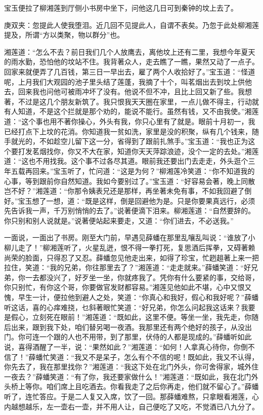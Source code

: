 \begin{parag}
    宝玉便拉了柳湘莲到厅侧小书房中坐下，问他这几日可到秦钟的坟上去了。\begin{note}庚双夹：忽提此人使我堕泪。近几回不见提此人，自谓不表矣。乃忽于此处柳湘莲提及，所谓“方以类聚，物以群分”也。\end{note}湘莲道：“怎么不去？前日我们几个人放鹰去，离他坟上还有二里，我想今年夏天的雨水勤，恐怕他的坟站不住。我背著众人，走去瞧了一瞧，果然又动了一点子。回家来就便弄了几百钱，第三日一早出去，雇了两个人收拾好了。”宝玉道：“怪道呢，上月我们大观园的池子里头结了莲蓬，我摘了十个，叫茗烟出去到坟上供他去，回来我也问他可被雨冲坏了没有。他说不但不冲，且比上回又新了些。我想著，不过是这几个朋友新筑了。我只恨我天天圈在家里，一点儿做不得主，行动就有人知道，不是这个拦就是那个劝的，能说不能行。虽然有钱，又不由我使。”湘莲道：“这个事也用不著你操心，外头有我，你只心里有了就是。眼前十月初一，我已经打点下上坟的花消。你知道我一贫如洗，家里是没的积聚，纵有几个钱来，随手就光的，不如趁空儿留下这一分，省得到了跟前扎煞手。”宝玉道：“我也正为这个要打发茗烟找你，你又不大在家，知道你天天萍踪浪迹，没个一定的去处。”湘莲道：“这也不用找我。这个事不过各尽其道。眼前我还要出门去走走，外头逛个三年五载再回来。”宝玉听了，忙问道：“这是为何？”柳湘莲冷笑道：“你不知道我的心事，等到跟前你自然知道。我如今要别过了。”宝玉道：“好容易会著，晚上同散岂不好？”湘莲道：“你那令姨表兄还是那样，再坐著未免有事，不如我回避了倒好。”宝玉想了一想，道：“既是这样，倒是回避他为是。只是你要果真远行，必须先告诉我一声，千万别悄悄的去了。”说著便滴下泪来。柳湘莲道：“自然要辞的。你只别和别人说就是。”说著便站起来要走，又道：“你们进去，不必送我。”
\end{parag}


\begin{parag}
    一面说，一面出了书房。刚至大门前，早遇见薛蟠在那里乱嚷乱叫说：“谁放了小柳儿走了！”柳湘莲听了，火星乱迸，恨不得一拳打死，复思酒后挥拳，又碍著赖尚荣的脸面，只得忍了又忍。薛蟠忽见他走出来，如得了珍宝，忙趔趄著上来一把拉住，笑道：“我的兄弟，你往那里去了？”湘莲道：“走走就来。”薛蟠笑道：“好兄弟，你一去都没兴了，好歹坐一坐，你就疼我了。凭你有什么要紧的事，交给哥，你只别忙，有你这个哥，你要做官发财都容易。”湘莲见他如此不堪，心中又恨又愧，早生一计，便拉他到避人之处，笑道：“你真心和我好，假心和我好呢？”薛蟠听这话，喜的心痒难挠，乜斜著眼忙笑道：“好兄弟，你怎么问起我这话来？我要是假心，立刻死在眼前！”湘莲道：“既如此，这里不便。等坐一坐，我先走，你随后出来，跟到我下处，咱们替另喝一夜酒。我那里还有两个绝好的孩子，从没出门。你可连一个跟的人也不用带，到了那里，伏侍的人都是现成的。”薛蟠听如此说，喜得酒醒了一半，说：“果然如此？”湘莲道：“如何！人拿真心待你，你倒不信了！”薛蟠忙笑道：“我又不是呆子，怎么有个不信的呢！既如此，我又不认得，你先去了，我在那里找你？”湘莲道：“我这下处在北门外头，你可舍得家，城外住一夜去？”薛蟠笑道：“有了你，我还要家做什么！”湘莲道：“既如此，我在北门外头桥上等你。咱们席上且吃酒去。你看我走了之后你再走，他们就不留心了。”薛蟠听了，连忙答应。于是二人复又入席，饮了一回。那薛蟠难熬，只拿眼看湘莲，心内越想越乐，左一壶右一壶，并不用人让，自己便吃了又吃，不觉酒已八九分了。
\end{parag}


